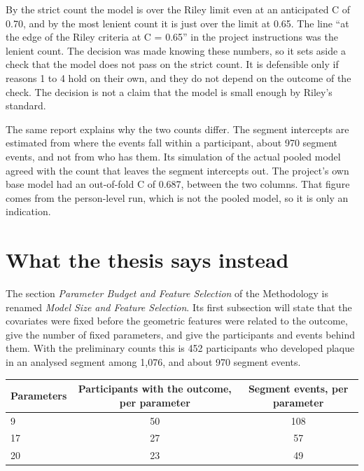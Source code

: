 \documentclass[11pt]{article}
\begin{document}
\begin{caution}
By the strict count the model is over the Riley limit even at an anticipated C of 0.70, and by the
most lenient count it is just over the limit at 0.65.
The line ``at the edge of the Riley criteria at C = 0.65'' in the project instructions was the lenient
count.
The decision was made knowing these numbers, so it sets aside a check that the model does not pass
on the strict count.
It is defensible only if reasons 1 to 4 hold on their own, and they do not depend on the outcome of
the check.
The decision is not a claim that the model is small enough by Riley's standard.
\end{caution}

The same report explains why the two counts differ.
The segment intercepts are estimated from where the events fall within a participant, about 970
segment events, and not from who has them.
Its simulation of the actual pooled model agreed with the count that leaves the segment intercepts out.
The project's own base model had an out-of-fold C of 0.687, between the two columns.
That figure comes from the person-level run, which is not the pooled model, so it is only an
indication.

\section{What the thesis says instead}

The section \emph{Parameter Budget and Feature Selection} of the Methodology is renamed
\emph{Model Size and Feature Selection}.
Its first subsection will state that the covariates were fixed before the geometric features were
related to the outcome, give the number of fixed parameters, and give the participants and events
behind them.
With the preliminary counts this is 452 participants who developed plaque in an analysed segment
among 1,076, and about 970 segment events.

\begin{center}
{\small\begin{tabular}{@{}lcc@{}}
\toprule
Parameters & Participants with the outcome, per parameter & Segment events, per parameter \\
\midrule
9 & 50 & 108 \\
17 & 27 & 57 \\
20 & 23 & 49 \\
\bottomrule
\end{tabular}}
\end{center}
\end{document}
